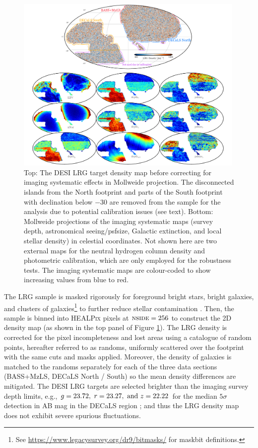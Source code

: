 \begin{figure}
 \centering
 \includegraphics[width=0.99\textwidth]{figures/dr9data.pdf}
 \caption{Top: The DESI LRG target density map before correcting for imaging systematic effects in Mollweide projection. The disconnected islands from the North footprint and parts of the South footprint with declination below $-30$ are removed from the sample for the analysis due to potential calibration issues (see text). Bottom: Mollweide projections of the imaging systematic maps (survey depth, astronomical seeing/psfsize, Galactic extinction, and local stellar density) in celestial coordinates. Not shown here are two external maps for the neutral hydrogen column density and photometric calibration, which are only employed for the robustness tests. The imaging systematic maps are colour-coded to show increasing values from blue to red. }
 \label{fig:ng}
\end{figure}

The LRG sample is masked rigorously for foreground bright stars, bright galaxies, and clusters of galaxies\footnote{See \url{https://www.legacysurvey.org/dr9/bitmasks/} for maskbit definitions.} to further reduce stellar contamination \citep{zhou2022target}. Then, the sample is binned into \textsc{HEALPix} \citep{gorski2005healpix} pixels at $\textsc{nside}=256$ to construct the 2D density map (as shown in the top panel of Figure \ref{fig:ng}). The LRG density is corrected for the pixel incompleteness and lost areas using a catalogue of random points, hereafter referred to as randoms, uniformly scattered over the footprint with the same cuts and masks applied. Moreover, the density of galaxies is matched to the randoms separately for each of the three data sections (BASS+MzLS, DECaLS North / South) so the mean density differences are mitigated. The DESI LRG targets are selected brighter than the imaging survey depth limits, e.g., $g=23.72,~r=23.27,~{\rm and}~z=22.22$ for the median $5\sigma$ detection in AB mag  in the DECaLS region \citep{dey2018overview}; and thus the LRG density map does not exhibit severe spurious fluctuations. 

